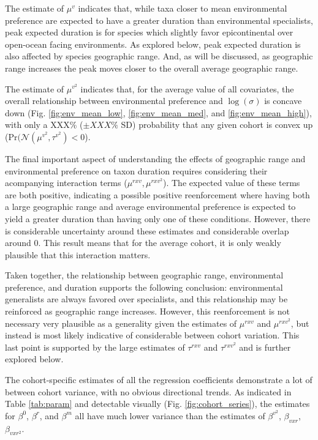 \documentclass{article}
\begin{document}
The estimate of \(\mu^{v}\) indicates that, while taxa closer to mean environmental preference are expected to have a greater duration than environmental specialists, peak expected duration is for species which slightly favor epicontinental over open-ocean facing environments. As explored below, peak expected duration is also affected by species geographic range. And, as will be discussed, as geographic range increases the peak moves closer to the overall average geographic range. 

The estimate of \(\mu^{v^{2}}\) indicates that, for the average value of all covariates, the overall relationship between environmental preference and \(\log(\sigma)\) is concave down (Fig. \ref{fig:env_mean_low}, \ref{fig:env_mean_med}, and \ref{fig:env_mean_high}), with only a XXX\% (\(\pm XXX\%\) SD) probability that any given cohort is convex up (\(\mathrm{Pr}(\mathcal{N}(\mu^{v^{2}}, \tau^{v^{2}}) < 0\)).

The final important aspect of understanding the effects of geographic range and environmental preference on taxon duration requires considering their acompanying interaction terms (\(\mu^{rxv}, \mu^{rxv^{2}}\)). The expected value of these terms are both positive, indicating a possible positive reenforcement where having both a large geographic range and average environmental preference is expected to yield a greater duration than having only one of these conditions. However, there is considerable uncertainty around these estimates and considerable overlap around 0. This result means that for the average cohort, it is only weakly plausible that this interaction matters.

Taken together, the relationship between geographic range, environmental preference, and duration supports the following conclusion: environmental generalists are always favored over specialists, and this relationship may be reinforced as geographic range increases. However, this reenforcement is not necessary very plausible as a generality given the estimates of \(\mu^{rxv}\) and \(\mu^{rxv^{2}}\), but instead is most likely indicative of considerable between cohort variation. This last point is supported by the large estimates of \(\tau^{rxv}\) and \(\tau^{rxv^{2}}\) and is further explored below.



The cohort-specific estimates of all the regression coefficients demonstrate a lot of between cohort variance, with no obvious directional trends. As indicated in Table \ref{tab:param} and detectable visually (Fig. \ref{fig:cohort_series}), the estimates for \(\beta^{0}\), \(\beta^{r}\), and \(\beta^{m}\) all have much lower variance than the estimates of \(\beta^{v^{2}}\), \(\beta_{vxr}\), \(\beta_{vxr^{2}}\).
\end{document}
